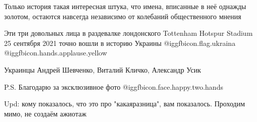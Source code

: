Только история такая интересная штука, что имена,  вписанные в неё однажды
золотом, остаются навсегда независимо от колебаний общественного мнения

Эти три довольных лица в раздевалке лондонского Tottenham Hotspur Stadium 25
сентября 2021 точно вошли в историю Украины  @igg{fbicon.flag.ukraina}
@igg{fbicon.hands.applause.yellow} 

Украинцы Андрей Шевченко, Виталий Кличко, Александр Усик

P.S. Благодарю за эксклюзивное фото  @igg{fbicon.face.happy.two.hands} 

Upd: кому показалось, что это про "какаяразница", вам показалось. Проходим
мимо, не создаём ажиотаж

